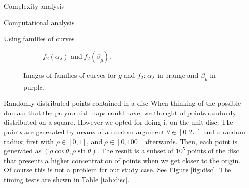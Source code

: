 \documentclass[11pt, a4paper, english, twoside, notitlepage, openright]{report}
\begin{document}
\begin{chapter}{Complexity analysis}
\begin{section}{Computational analysis}
\begin{subsection}{Using families of curves}
\begin{figure}
\begin{subfigure}{.45\linewidth}
\vspace{-0.4cm}\caption{$f_2(\alpha_{\lambda})$ and $f_2(\beta_{\mu})$.\label{fig:3curves3}}
\end{subfigure}
\vspace{-0.1cm}\caption{Images of families of curves for $g$ and $f_2$: $\alpha_{\lambda}$ in orange and $\beta_{\mu}$ in purple.\label{fig:curvesfg}}
\end{figure}

\end{subsection}

\begin{subsection}{Randomly distributed points contained in a disc}
When thinking of the possible domain that the polynomial maps could have, we thought of points randomly distributed on a square. However we opted for doing it on the unit disc. The points are generated by means of a random argument $\theta\in[0,2\pi]$ and a random radius; first with $\rho\in[0,1]$, and $\rho\in[0,100]$ afterwards. Then, each point is generated as $(\rho\cos\theta,\rho\sin\theta)$. The result is a subset of $10^5$ points of the disc that presents a higher concentration of points when we get closer to the origin. Of course this is not a problem for our study case. See Figure \ref{fig:disc}. The timing tests are shown in Table \ref{tab:disc}.


\end{subsection}
\end{section}
\end{chapter}
\end{document}
